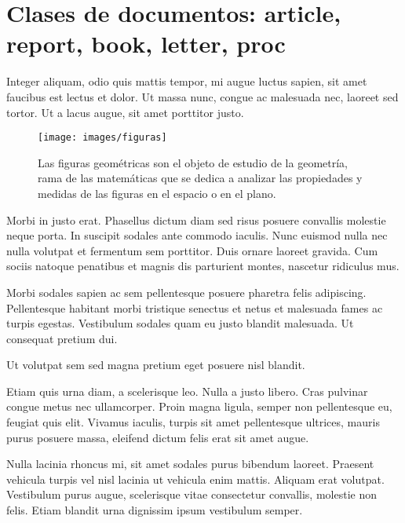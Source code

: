 \documentclass[12pt,a4paper]{report}
\begin{document}
\section[Clase de documentos]{Clases de documentos: article, report, book, letter, proc}
\label{seccion.clases}



Integer aliquam, odio quis mattis tempor, mi augue luctus sapien, sit amet faucibus est lectus et dolor. Ut massa nunc, congue ac malesuada nec, laoreet sed tortor. Ut a lacus augue, sit amet porttitor justo. 



\begin{wrapfigure}[20]{r}{6cm}
\centering
\texttt{[image: images/figuras]}
\caption[Figuras geométricas]{Las figuras geométricas son el objeto de estudio de la geometría, rama de las matemáticas que se dedica a analizar las propiedades y medidas de las figuras en el espacio o en el plano.}
\label{fig.plantulas}
\end{wrapfigure}



Morbi in justo erat. Phasellus dictum diam sed risus posuere convallis molestie neque porta. In suscipit sodales ante commodo iaculis. Nunc euismod nulla nec nulla volutpat et fermentum sem porttitor. Duis ornare laoreet gravida. Cum sociis natoque penatibus et magnis dis parturient montes, nascetur ridiculus mus. 


Morbi sodales sapien ac sem pellentesque posuere pharetra felis adipiscing. Pellentesque habitant morbi tristique senectus et netus et malesuada fames ac turpis egestas. Vestibulum sodales quam eu justo blandit malesuada. Ut consequat pretium dui. 

Ut volutpat sem sed magna pretium eget posuere nisl blandit.

Etiam quis urna diam, a scelerisque leo. Nulla a justo libero. Cras pulvinar congue metus nec ullamcorper. Proin magna ligula, semper non pellentesque eu, feugiat quis elit. Vivamus iaculis, turpis sit amet pellentesque ultrices, mauris purus posuere massa, eleifend dictum felis erat sit amet augue. 

Nulla lacinia rhoncus mi, sit amet sodales purus bibendum laoreet. Praesent vehicula turpis vel nisl lacinia ut vehicula enim mattis. Aliquam erat volutpat. Vestibulum purus augue, scelerisque vitae consectetur convallis, molestie non felis. Etiam blandit urna dignissim ipsum vestibulum semper.
\end{document}
